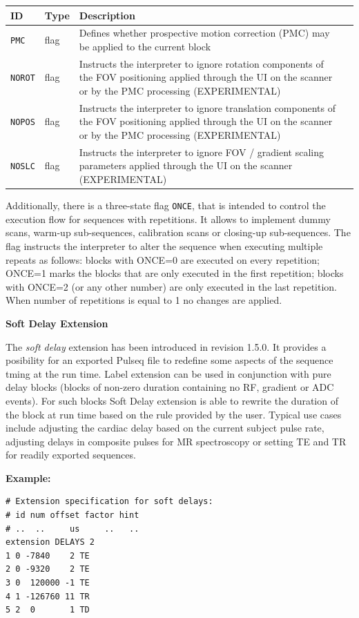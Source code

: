 \documentclass{article}
\begin{document}
\begin{tabularx}{\textwidth}{llXl}
\toprule
ID & Type & Description\\
\midrule
\verb.PMC. & flag & Defines whether prospective motion correction (PMC) may be applied to the current block \\
\verb.NOROT. & flag & Instructs the interpreter to ignore rotation components of the FOV positioning applied through the UI on the scanner or by the PMC processing (EXPERIMENTAL) \\
\verb.NOPOS. & flag & Instructs the interpreter to ignore translation components of the FOV positioning applied through the UI on the scanner or by the PMC processing (EXPERIMENTAL) \\
\verb.NOSLC. & flag & Instructs the interpreter to ignore FOV / gradient scaling parameters applied through the UI on the scanner (EXPERIMENTAL) \\
\bottomrule
\end{tabularx}

Additionally, there is a three-state flag \verb.ONCE., that is intended to control the execution flow for sequences with repetitions. It allows to implement dummy scans, warm-up sub-sequences, calibration scans or closing-up sub-sequences. The flag instructs the interpreter to alter the sequence when executing multiple repeats as follows: blocks with ONCE=0 are executed on every repetition; ONCE=1 marks the blocks that are only executed in the first repetition; blocks with ONCE=2 (or any other number) are only executed in the last repetition. When number of repetitions is equal to 1 no changes are applied.

\textbf{Soft Delay Extension}

The \textit{soft delay} extension has been introduced in revision 1.5.0. It provides a posibility for an exported Pulseq file to redefine some aspects of the sequence tming at the run time. Label extension can be used in conjunction with pure delay blocks (blocks of non-zero duration containing no RF, gradient or ADC events). For such blocks Soft Delay extension is able to rewrite the duration of the block at run time based on the rule provided by the user. Typical use cases include adjusting the cardiac delay based on the current subject pulse rate, adjusting delays in composite pulses for MR spectroscopy or setting TE and TR for readily exported sequences. 

\begin{minipage}{\textwidth}
\textbf{Example:}
\begin{lstlisting}
# Extension specification for soft delays:
# id num offset factor hint
# ..  ..     us     ..   ..
extension DELAYS 2
1 0 -7840    2 TE
2 0 -9320    2 TE
3 0  120000 -1 TE
4 1 -126760 11 TR
5 2  0       1 TD 
\end{lstlisting}
\end{minipage}
\end{document}
